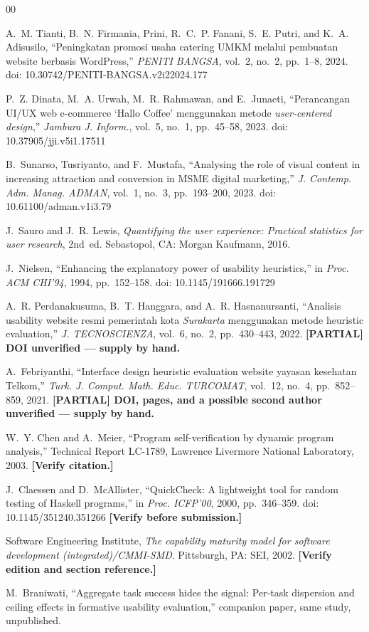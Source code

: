 \documentclass[conference]{IEEEtran}
\begin{document}
\begin{thebibliography}{00}

A.~M. Tianti, B.~N. Firmania, Prini, R.~C.~P. Fanani, S.~E. Putri, and K.~A. Adisusilo,
``Peningkatan promosi usaha catering UMKM melalui pembuatan website berbasis WordPress,''
\textit{PENITI BANGSA}, vol.~2, no.~2, pp.~1--8, 2024.
doi: 10.30742/PENITI-BANGSA.v2i22024.177

P.~Z. Dinata, M.~A. Urwah, M.~R. Rahmawan, and E.~Junaeti, ``Perancangan UI/UX web e-commerce
`Hallo Coffee' menggunakan metode \emph{user-centered design},'' \textit{Jambura J. Inform.},
vol.~5, no.~1, pp.~45--58, 2023. doi: 10.37905/jji.v5i1.17511

B.~Sunarso, Tusriyanto, and F.~Mustafa, ``Analysing the role of visual content in increasing
attraction and conversion in MSME digital marketing,'' \textit{J. Contemp. Adm. Manag. ADMAN},
vol.~1, no.~3, pp.~193--200, 2023. doi: 10.61100/adman.v1i3.79

J.~Sauro and J.~R. Lewis, \emph{Quantifying the user experience: Practical statistics for user
research}, 2nd~ed. Sebastopol, CA: Morgan Kaufmann, 2016.

J.~Nielsen, ``Enhancing the explanatory power of usability heuristics,'' in \emph{Proc. ACM CHI'94},
1994, pp.~152--158. doi: 10.1145/191666.191729

A.~R. Perdanakusuma, B.~T. Hanggara, and A.~R. Hasnanursanti, ``Analisis usability website resmi
pemerintah kota \emph{Surakarta} menggunakan metode heuristic evaluation,'' \textit{J. TECNOSCIENZA},
vol.~6, no.~2, pp.~430--443, 2022.
\textbf{[PARTIAL] DOI unverified --- supply by hand.}

A.~Febriyanthi, ``Interface design heuristic evaluation website yayasan kesehatan Telkom,''
\textit{Turk. J. Comput. Math. Educ. TURCOMAT}, vol.~12, no.~4, pp.~852--859, 2021.
\textbf{[PARTIAL] DOI, pages, and a possible second author unverified --- supply by hand.}

W.~Y. Chen and A.~Meier, ``Program self-verification by dynamic program analysis,'' Technical
Report LC-1789, Lawrence Livermore National Laboratory, 2003. \textbf{[Verify citation.]}

J.~Claessen and D.~McAllister, ``QuickCheck: A lightweight tool for random testing of Haskell
programs,'' in \emph{Proc. ICFP'00}, 2000, pp.~346--359. doi: 10.1145/351240.351266
\textbf{[Verify before submission.]}

Software Engineering Institute, \emph{The capability maturity model for software development
(integrated)/CMMI-SMD}. Pittsburgh, PA: SEI, 2002. \textbf{[Verify edition and section reference.]}

M.~Braniwati, ``Aggregate task success hides the signal: Per-task dispersion and ceiling effects in
formative usability evaluation,'' companion paper, same study, unpublished.

\end{thebibliography}
\end{document}
